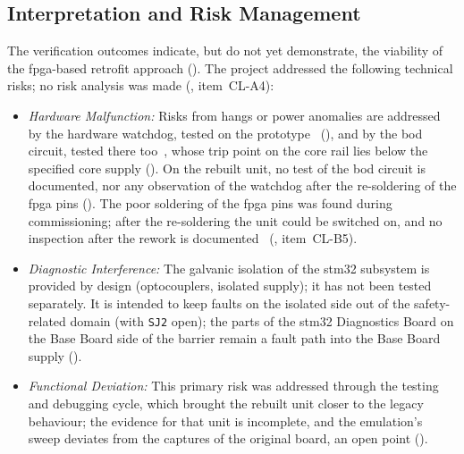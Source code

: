 \subsection{Interpretation and Risk Management}
The verification outcomes indicate, but do not yet demonstrate, the viability of the \gls{fpga}-based retrofit approach (). The project addressed the following technical risks; no risk analysis was made (, item~CL-A4):
\begin{itemize}
	\item \textit{Hardware Malfunction:} Risks from hangs or power anomalies are addressed by the hardware watchdog, tested on the prototype~\cite[Sec.~4.6]{leyer2023} (), and by the \gls{bod} circuit, tested there too~\cite[Sec.~4.7]{leyer2023}, whose trip point on the core rail lies below the specified core supply (). On the rebuilt unit, no test of the \gls{bod} circuit is documented, nor any observation of the watchdog after the re-soldering of the \gls{fpga} pins (). The poor soldering of the \gls{fpga} pins was found during commissioning; after the re-soldering the unit could be switched on, and no inspection after the rework is documented~\cite[p.~13]{savchuk2025} (, item~CL-B5).
	\item \textit{Diagnostic Interference:} The galvanic isolation of the \gls{stm32} subsystem is provided by design (optocouplers, isolated supply); it has not been tested separately. It is intended to keep faults on the isolated side out of the safety-related domain (with \texttt{SJ2} open); the parts of the \gls{stm32} Diagnostics Board on the Base Board side of the barrier remain a fault path into the Base Board supply ().
	\item \textit{Functional Deviation:} This primary risk was addressed through the testing and debugging cycle, which brought the rebuilt unit closer to the legacy behaviour; the evidence for that unit is incomplete, and the emulation's sweep deviates from the captures of the original board, an open point ().
\end{itemize}

